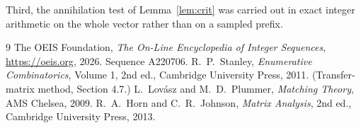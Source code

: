 \documentclass[11pt,a4paper]{article}
\theoremstyle{plain}
\theoremstyle{definition}
\begin{document}
Third, the annihilation test of Lemma~\ref{lem:crit} was carried out in exact integer
arithmetic on the whole vector rather than on a sampled prefix.

\begin{thebibliography}{9}
 The OEIS Foundation, \emph{The On-Line Encyclopedia of Integer
Sequences}, \url{https://oeis.org}, 2026. Sequence A220706.
 R.~P.~Stanley, \emph{Enumerative Combinatorics}, Volume 1, 2nd ed.,
Cambridge University Press, 2011. (Transfer-matrix method, Section 4.7.)
 L.~Lov\'asz and M.~D.~Plummer, \emph{Matching Theory}, AMS Chelsea,
2009.
 R.~A.~Horn and C.~R.~Johnson, \emph{Matrix Analysis}, 2nd ed., Cambridge
University Press, 2013.
\end{thebibliography}
\end{document}
